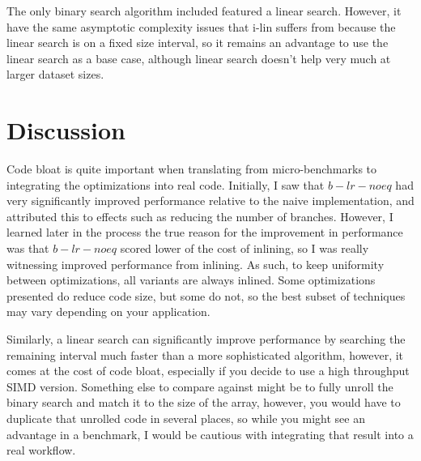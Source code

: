 \documentclass[twocolumn]{article}
\begin{document}
The only binary search algorithm included featured a linear search. However, it have the same asymptotic complexity issues that i-lin suffers from because the linear search is on a fixed size interval, so it remains an advantage to use the linear search as a base case, although linear search doesn't help very much at larger dataset sizes.


\begin{figure}
\end{figure}

\section{Discussion}
Code bloat is quite important when translating from micro-benchmarks to integrating the optimizations into real code. Initially, I saw that $b-lr-noeq$ had very significantly improved performance relative to the naive implementation, and attributed this to effects such as reducing the number of branches. However, I learned later in the process the true reason for the improvement in performance was that $b-lr-noeq$ scored lower of the cost of inlining, so I was really witnessing improved performance from inlining. As such, to keep uniformity between optimizations, all variants are always inlined. Some optimizations presented do reduce code size, but some do not, so the best subset of techniques may vary depending on your application.

Similarly, a linear search can significantly improve performance by searching the remaining interval much faster than a more sophisticated algorithm, however, it comes at the cost of code bloat, especially if you decide to use a high throughput SIMD version. Something else to compare against might be to fully unroll the binary search and match it to the size of the array, however, you would have to duplicate that unrolled code in several places, so while you might see an advantage in a benchmark, I would be cautious with integrating that result into a real workflow.
\end{document}
